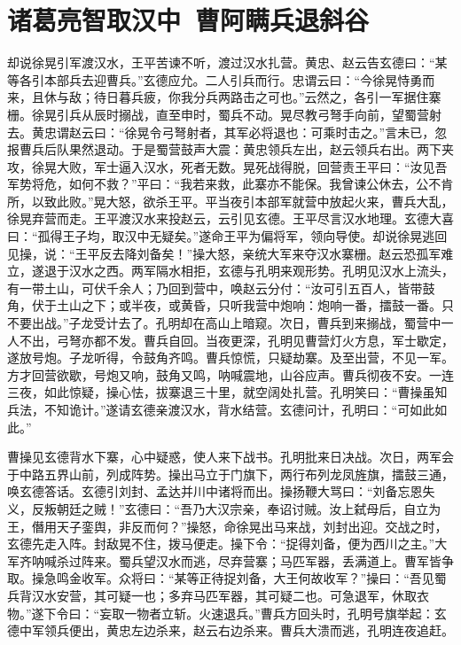 \chapter{诸葛亮智取汉中~曹阿瞒兵退斜谷}

却说徐晃引军渡汉水，王平苦谏不听，渡过汉水扎营。黄忠、赵云告玄德曰：“某等各引本部兵去迎曹兵。”玄德应允。二人引兵而行。忠谓云曰：“今徐晃恃勇而来，且休与敌；待日暮兵疲，你我分兵两路击之可也。”云然之，各引一军据住寨栅。徐晃引兵从辰时搦战，直至申时，蜀兵不动。晃尽教弓弩手向前，望蜀营射去。黄忠谓赵云曰：“徐晃令弓弩射者，其军必将退也：可乘时击之。”言未已，忽报曹兵后队果然退动。于是蜀营鼓声大震：黄忠领兵左出，赵云领兵右出。两下夹攻，徐晃大败，军士逼入汉水，死者无数。晃死战得脱，回营责王平曰：“汝见吾军势将危，如何不救？”平曰：“我若来救，此寨亦不能保。我曾谏公休去，公不肯所，以致此败。”晃大怒，欲杀王平。平当夜引本部军就营中放起火来，曹兵大乱，徐晃弃营而走。王平渡汉水来投赵云，云引见玄德。王平尽言汉水地理。玄德大喜曰：“孤得王子均，取汉中无疑矣。”遂命王平为偏将军，领向导使。却说徐晃逃回见操，说：“王平反去降刘备矣！”操大怒，亲统大军来夺汉水寨栅。赵云恐孤军难立，遂退于汉水之西。两军隔水相拒，玄德与孔明来观形势。孔明见汉水上流头，有一带土山，可伏千余人；乃回到营中，唤赵云分付：“汝可引五百人，皆带鼓角，伏于土山之下；或半夜，或黄昏，只听我营中炮响：炮响一番，擂鼓一番。只不要出战。”子龙受计去了。孔明却在高山上暗窥。次日，曹兵到来搦战，蜀营中一人不出，弓弩亦都不发。曹兵自回。当夜更深，孔明见曹营灯火方息，军士歇定，遂放号炮。子龙听得，令鼓角齐鸣。曹兵惊慌，只疑劫寨。及至出营，不见一军。方才回营欲歇，号炮又响，鼓角又鸣，呐喊震地，山谷应声。曹兵彻夜不安。一连三夜，如此惊疑，操心怯，拔寨退三十里，就空阔处扎营。孔明笑曰：“曹操虽知兵法，不知诡计。”遂请玄德亲渡汉水，背水结营。玄德问计，孔明曰：“可如此如此。”

曹操见玄德背水下寨，心中疑惑，使人来下战书。孔明批来日决战。次日，两军会于中路五界山前，列成阵势。操出马立于门旗下，两行布列龙凤旌旗，擂鼓三通，唤玄德答话。玄德引刘封、孟达并川中诸将而出。操扬鞭大骂曰：“刘备忘恩失义，反叛朝廷之贼！”玄德曰：“吾乃大汉宗亲，奉诏讨贼。汝上弑母后，自立为王，僭用天子銮舆，非反而何？”操怒，命徐晃出马来战，刘封出迎。交战之时，玄德先走入阵。封敌晃不住，拨马便走。操下令：“捉得刘备，便为西川之主。”大军齐呐喊杀过阵来。蜀兵望汉水而逃，尽弃营寨；马匹军器，丢满道上。曹军皆争取。操急鸣金收军。众将曰：“某等正待捉刘备，大王何故收军？”操曰：“吾见蜀兵背汉水安营，其可疑一也；多弃马匹军器，其可疑二也。可急退军，休取衣物。”遂下令曰：“妄取一物者立斩。火速退兵。”曹兵方回头时，孔明号旗举起：玄德中军领兵便出，黄忠左边杀来，赵云右边杀来。曹兵大溃而逃，孔明连夜追赶。

